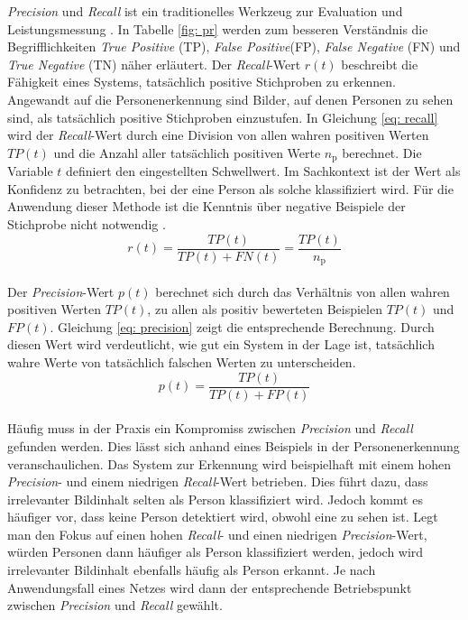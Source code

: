 		
		
		\textit{Precision} und \textit{Recall} ist ein traditionelles Werkzeug zur Evaluation und Leistungsmessung \cite{precisionandrecall}. In Tabelle \ref{fig: pr} werden zum besseren Verständnis die Begrifflichkeiten \textit{True Positive} (TP), \textit{False Positive}(FP), \textit{False Negative} (FN) und \textit{True Negative} (TN) näher erläutert. Der \textit{Recall}-Wert $r(t)$ beschreibt die Fähigkeit eines Systems, tatsächlich positive Stichproben zu erkennen. Angewandt auf die Personenerkennung sind Bilder, auf denen Personen zu sehen sind, als tatsächlich positive Stichproben einzustufen. In Gleichung \ref{eq: recall} wird der \textit{Recall}-Wert durch eine Division von allen wahren positiven Werten $TP(t)$ und die Anzahl aller tatsächlich positiven Werte $n_\text{p}$ berechnet. Die Variable $t$ definiert den eingestellten Schwellwert. Im Sachkontext ist der Wert als Konfidenz zu betrachten, bei der eine Person als solche klassifiziert wird. Für die Anwendung dieser Methode ist die Kenntnis über negative Beispiele der Stichprobe nicht notwendig \cite{bildundobjekt}.\\ 
		
		\begin{equation}
		r(t)=\frac{TP(t)}{TP(t)+FN(t)}=\frac{TP(t)}{n_\text{p}}
		\label{eq: recall}
		\end{equation}\\
		
		Der \textit{Precision}-Wert $p(t)$ berechnet sich durch das Verhältnis von allen wahren positiven Werten $TP(t)$, zu allen als positiv bewerteten Beispielen $TP(t)$ und $FP(t)$. Gleichung \ref{eq: precision} zeigt die entsprechende Berechnung. Durch diesen Wert wird verdeutlicht, wie gut ein System in der Lage ist, tatsächlich wahre Werte von tatsächlich falschen Werten zu unterscheiden.\\
		
		\begin{equation}
		p(t)=\frac{TP(t)}{TP(t)+FP(t)}
		\label{eq: precision}
		\end{equation}\\
		
		Häufig muss in der Praxis ein Kompromiss zwischen \textit{Precision} und \textit{Recall} gefunden werden. Dies lässt sich anhand eines Beispiels in der Personenerkennung veranschaulichen. Das System zur Erkennung wird beispielhaft mit einem hohen \textit{Precision}- und einem niedrigen \textit{Recall}-Wert betrieben. Dies führt dazu, dass irrelevanter Bildinhalt selten als Person klassifiziert wird. Jedoch kommt es häufiger vor, dass keine Person detektiert wird, obwohl eine zu sehen ist. Legt man den Fokus auf einen hohen \textit{Recall}- und einen niedrigen \textit{Precision}-Wert, würden Personen dann häufiger als Person klassifiziert werden, jedoch wird irrelevanter Bildinhalt ebenfalls häufig als Person erkannt. Je nach Anwendungsfall eines Netzes wird dann der entsprechende Betriebspunkt zwischen \textit{Precision} und \textit{Recall} gewählt.\\
		
